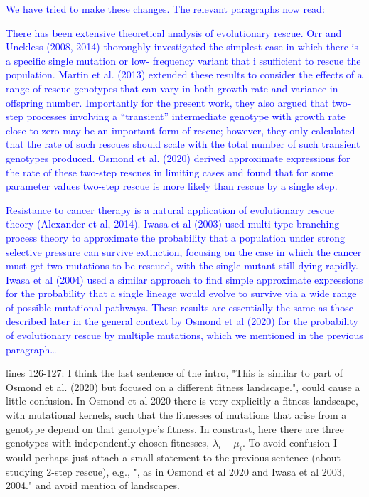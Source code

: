 \documentclass[12pt]{extarticle}
\begin{document}
\textcolor{blue}{ We have tried to make these changes. The relevant paragraphs now read:}
\begin{displayquote}
	\textcolor{blue}{
    There has been extensive theoretical analysis of evolutionary rescue. Orr and Unckless (2008,
    2014) thoroughly investigated the simplest case in which there is a specific single mutation or low-
    frequency variant that i ssufficient to rescue the population. 
    Martin et al. (2013) extended these results
    to consider the effects of a range of rescue genotypes that can vary in both growth rate and variance in
    offspring number. 
    Importantly for the present work, they also argued that two-step processes involving
    a ``transient'' intermediate genotype with growth rate close to zero may be an important form of rescue;
    however, they only calculated that the rate of such rescues should scale with the total number of such
    transient genotypes produced. Osmond et al. (2020) derived approximate expressions for the rate of
    these two-step rescues in limiting cases and found that for some parameter values two-step rescue is
    more likely than rescue by a single step.}
    
    \textcolor{blue}{
    Resistance to cancer therapy is a natural application of evolutionary rescue theory (Alexander et al, 2014). 
    Iwasa et al (2003) used multi-type branching process theory to approximate the probability that a population under strong selective pressure can survive extinction, focusing on the case in which the cancer must get two mutations to be rescued, with the single-mutant still dying rapidly.
    Iwasa et al (2004) used a similar approach to find simple approximate expressions for the probability that a single lineage would evolve to survive via a wide range of possible mutational pathways.
    These results are essentially the same as those described later in the general context by Osmond et al (2020) for the probability of evolutionary rescue by multiple mutations,
    which we mentioned in the previous paragraph\ldots}
\end{displayquote}



lines 126-127: I think the last sentence of the intro, "This is similar to part of Osmond et al. (2020) but focused on a different fitness landscape.", could cause a little confusion. In Osmond et al 2020 there is very explicitly a fitness landscape, with mutational kernels, such that the fitnesses of mutations that arise from a genotype depend on that genotype's fitness. In constrast, here there are three genotypes with independently chosen fitnesses, $\lambda_i - \mu_i$. To avoid confusion I would perhaps just attach a small statement to the previous sentence (about studying 2-step rescue), e.g., ", as in Osmond et al 2020 and Iwasa et al 2003, 2004." and avoid mention of landscapes.
\end{document}
